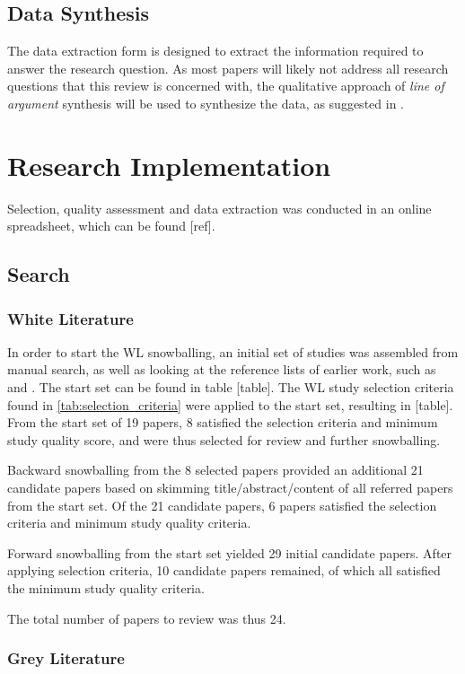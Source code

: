 \subsection{Data Synthesis}
The data extraction form is designed to extract the information required to answer the research question.
As most papers will likely not address all research questions that this review is concerned with, the qualitative approach of \textit{line of argument} synthesis will be used to synthesize the data, as suggested in \cite{Kitchenham07guidelinesfor}.

\section{Research Implementation}
\label{sec:research_implementation}
Selection, quality assessment and data extraction was conducted in an online spreadsheet, which can be found [ref].

\subsection{Search}
\subsubsection{White Literature}
In order to start the WL snowballing, an initial set of studies was assembled from manual search, as well as looking at the reference lists of earlier work, such as \cite{John2021} and \cite{MartinezFernandez2021}.
The start set can be found in table [table].
The WL study selection criteria found in \cref{tab:selection_criteria} were applied to the start set, resulting in [table].
From the start set of 19 papers, 8 satisfied the selection criteria and minimum study quality score, and were thus selected for review and further snowballing.

Backward snowballing from the 8 selected papers provided an additional 21 candidate papers based on skimming title/abstract/content of all referred papers from the start set.
Of the 21 candidate papers, 6 papers satisfied the selection criteria and minimum study quality criteria.

Forward snowballing from the start set yielded 29 initial candidate papers.
After applying selection criteria, 10 candidate papers remained, of which all satisfied the minimum study quality criteria.

The total number of papers to review was thus 24.

\subsubsection{Grey Literature}

